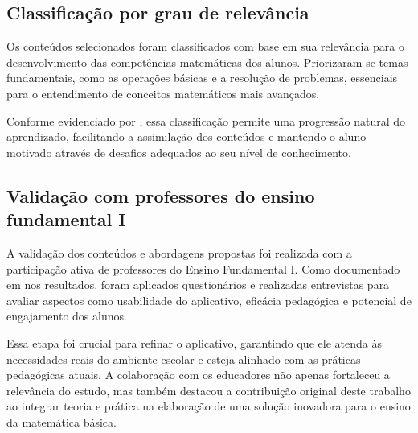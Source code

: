 \subsection{Classificação por grau de relevância}

Os conteúdos selecionados foram classificados com base em sua relevância para o desenvolvimento das competências matemáticas dos alunos. Priorizaram-se temas fundamentais, como as operações básicas e a resolução de problemas, essenciais para o entendimento de conceitos matemáticos mais avançados.

Conforme evidenciado por \cite{mesquita2023gamificacao}, essa classificação permite uma progressão natural do aprendizado, facilitando a assimilação dos conteúdos e mantendo o aluno motivado através de desafios adequados ao seu nível de conhecimento.

\subsection{Validação com professores do ensino fundamental I}

A validação dos conteúdos e abordagens propostas foi realizada com a participação ativa de professores do Ensino Fundamental I. Como documentado em nos resultados, foram aplicados questionários e realizadas entrevistas para avaliar aspectos como usabilidade do aplicativo, eficácia pedagógica e potencial de engajamento dos alunos.

Essa etapa foi crucial para refinar o aplicativo, garantindo que ele atenda às necessidades reais do ambiente escolar e esteja alinhado com as práticas pedagógicas atuais. A colaboração com os educadores não apenas fortaleceu a relevância do estudo, mas também destacou a contribuição original deste trabalho ao integrar teoria e prática na elaboração de uma solução inovadora para o ensino da matemática básica.

